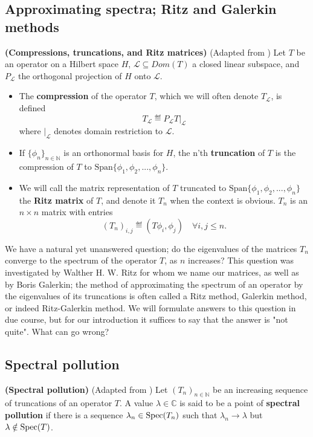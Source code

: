 \documentclass[../main.tex]{subfiles}
\begin{document}
\subsection{Approximating spectra; Ritz and Galerkin methods}

\begin{definition}{\textbf{(Compressions, truncations, and Ritz matrices)}}
(Adapted from \parencite{davies1995spectral})
Let $T$ be an operator on a Hilbert space $H$, $\mathcal{L} \subseteq Dom(T)$ a closed linear subspace, and $P_\mathcal{L}$ the orthogonal projection
of $H$ onto $\mathcal{L}$.
\begin{itemize}
\item The \textbf{compression} of the operator $T$, which we will often denote $T_\mathcal{L}$, is defined
$$T_\mathcal{L} \eqdef P_\mathcal{L} T\big|_{\mathcal{L}}$$
where $\big|_{\mathcal{L}}$ denotes domain restriction to $\mathcal{L}$.
\item If $\{\phi_n\}_{n \in \mathbb{N}}$ is an orthonormal basis for $H$, the n'th \textbf{truncation} of $T$ is the compression of $T$ to $\text{Span}\{\phi_1, \phi_2, ..., \phi_n\}$.
\item We will call the matrix representation of $T$ truncated to $\mathrm{Span}\{\phi_1, \phi_2, ..., \phi_n\}$ the \textbf{Ritz matrix} of $T$,
and denote it $T_n$ when the context is obvious. $T_n$ is an $n \times n$ matrix with entries
$$(T_n)_{i,j}  \eqdef (T\phi_i, \phi_j) \quad \forall i, j \leq n.$$
\end{itemize}
\end{definition}

We have a natural yet unanswered question; do the eigenvalues of the matrices $T_n$ converge to the spectrum of the operator $T$, as $n$ increases? This question was investigated by Walther H. W. Ritz for whom we name our matrices, as well as by Boris Galerkin; the method of approximating the spectrum of an operator by the eigenvalues of its truncations is often called a Ritz method, Galerkin method, or indeed Ritz-Galerkin method. We will formulate answers
to this question in due course, but for our introduction it suffices to say that the answer is "not quite". What can go wrong?

\subsection{Spectral pollution}

\begin{definition}{\textbf{(Spectral pollution)}}
(Adapted from \parencite{davies1995spectral})
Let $(T_n)_{n \in \mathbb{N}}$ be an increasing sequence of truncations of an operator $T$. A value $\lambda \in \mathbb{C}$ is said to be a point of \textbf{spectral pollution} if there is a sequence $\lambda_n \in \mathrm{Spec}(T_n)$ such that $\lambda_n \rightarrow \lambda$ but $\lambda \notin \mathrm{Spec}(T)$.
\end{definition}
\end{document}
